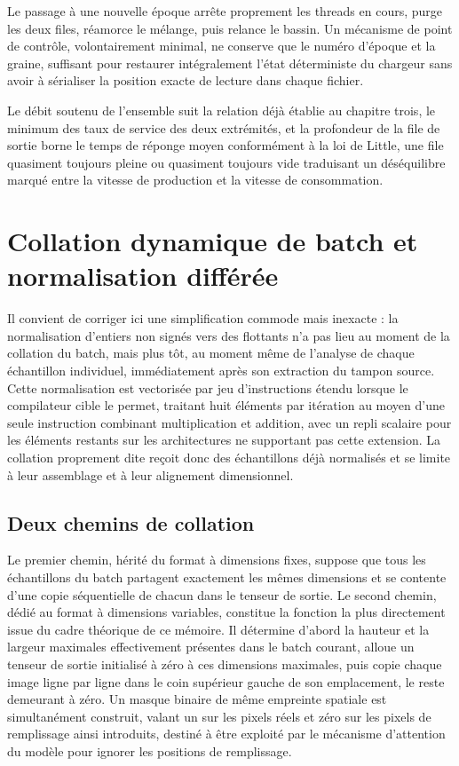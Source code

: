 \documentclass[12pt,a4paper]{report}
\begin{document}
Le passage à une nouvelle époque arrête proprement les threads en cours, purge les deux files, réamorce le mélange, puis relance le bassin. Un mécanisme de point de contrôle, volontairement minimal, ne conserve que le numéro d'époque et la graine, suffisant pour restaurer intégralement l'état déterministe du chargeur sans avoir à sérialiser la position exacte de lecture dans chaque fichier.

Le débit soutenu de l'ensemble suit la relation déjà établie au chapitre trois, le minimum des taux de service des deux extrémités, et la profondeur de la file de sortie borne le temps de réponge moyen conformément à la loi de Little, une file quasiment toujours pleine ou quasiment toujours vide traduisant un déséquilibre marqué entre la vitesse de production et la vitesse de consommation.

\section{Collation dynamique de batch et normalisation différée}
\label{sec:collation_cpp}

Il convient de corriger ici une simplification commode mais inexacte : la normalisation d'entiers non signés vers des flottants n'a pas lieu au moment de la collation du batch, mais plus tôt, au moment même de l'analyse de chaque échantillon individuel, immédiatement après son extraction du tampon source. Cette normalisation est vectorisée par jeu d'instructions étendu lorsque le compilateur cible le permet, traitant huit éléments par itération au moyen d'une seule instruction combinant multiplication et addition, avec un repli scalaire pour les éléments restants sur les architectures ne supportant pas cette extension. La collation proprement dite reçoit donc des échantillons déjà normalisés et se limite à leur assemblage et à leur alignement dimensionnel.

\subsection{Deux chemins de collation}

Le premier chemin, hérité du format à dimensions fixes, suppose que tous les échantillons du batch partagent exactement les mêmes dimensions et se contente d'une copie séquentielle de chacun dans le tenseur de sortie. Le second chemin, dédié au format à dimensions variables, constitue la fonction la plus directement issue du cadre théorique de ce mémoire. Il détermine d'abord la hauteur et la largeur maximales effectivement présentes dans le batch courant, alloue un tenseur de sortie initialisé à zéro à ces dimensions maximales, puis copie chaque image ligne par ligne dans le coin supérieur gauche de son emplacement, le reste demeurant à zéro. Un masque binaire de même empreinte spatiale est simultanément construit, valant un sur les pixels réels et zéro sur les pixels de remplissage ainsi introduits, destiné à être exploité par le mécanisme d'attention du modèle pour ignorer les positions de remplissage.
\end{document}
